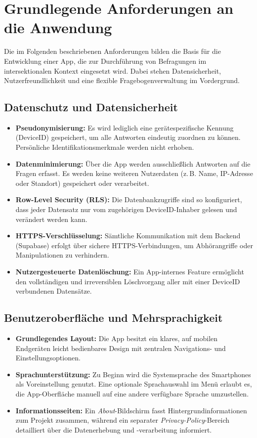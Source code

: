 \section{Grundlegende Anforderungen an die Anwendung}
\label{sec:grundlegende_anforderungen}

Die im Folgenden beschriebenen Anforderungen bilden die Basis für die Entwicklung einer App, die zur Durchführung von Befragungen im intersektionalen Kontext eingesetzt wird. Dabei stehen Datensicherheit, Nutzerfreundlichkeit und eine flexible Fragebogenverwaltung im Vordergrund.

\subsection{Datenschutz und Datensicherheit}
\begin{itemize}
  \item \textbf{Pseudonymisierung:} Es wird lediglich eine gerätespezifische Kennung (DeviceID) gespeichert, um alle Antworten eindeutig zuordnen zu können. Persönliche Identifikationsmerkmale werden nicht erhoben.
  \item \textbf{Datenminimierung:} Über die App werden ausschließlich Antworten auf die Fragen erfasst. Es werden keine weiteren Nutzerdaten (z.\,B. Name, IP-Adresse oder Standort) gespeichert oder verarbeitet.
  \item \textbf{Row-Level Security (RLS):} Die Datenbankzugriffe sind so konfiguriert, dass jeder Datensatz nur vom zugehörigen DeviceID-Inhaber gelesen und verändert werden kann.
  \item \textbf{HTTPS-Verschlüsselung:} Sämtliche Kommunikation mit dem Backend (Supabase) erfolgt über sichere HTTPS-Verbindungen, um Abhörangriffe oder Manipulationen zu verhindern.
  \item \textbf{Nutzergesteuerte Datenlöschung:} Ein App-internes Feature ermöglicht den vollständigen und irreversiblen Löschvorgang aller mit einer DeviceID verbundenen Datensätze.
\end{itemize}

\subsection{Benutzeroberfläche und Mehrsprachigkeit}
\begin{itemize}
  \item \textbf{Grundlegendes Layout:} Die App besitzt ein klares, auf mobilen Endgeräten leicht bedienbares Design mit zentralen Navigations- und Einstellungsoptionen.
  \item \textbf{Sprachunterstützung:} Zu Beginn wird die Systemsprache des Smartphones als Voreinstellung genutzt. Eine optionale Sprachauswahl im Menü erlaubt es, die App-Oberfläche manuell auf eine andere verfügbare Sprache umzustellen.
  \item \textbf{Informationsseiten:} Ein \textit{About}-Bildschirm fasst Hintergrundinformationen zum Projekt zusammen, während ein separater \textit{Privacy-Policy}-Bereich detailliert über die Datenerhebung und -verarbeitung informiert.
\end{itemize}


